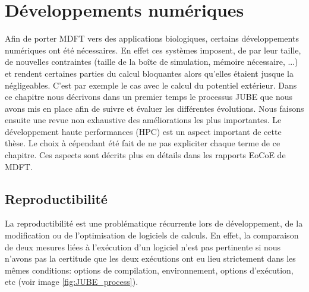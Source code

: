 \chapter{Développements numériques}
\label{chap:numerique}



Afin de porter MDFT vers des applications biologiques, certains développements numériques ont été nécessaires. En effet ces systèmes imposent, de par leur taille, de nouvelles contraintes (taille de la boîte de simulation, mémoire nécessaire, ...) et rendent certaines parties du calcul bloquantes alors qu'elles étaient jusque la négligeables. C'est par exemple le cas avec le calcul du potentiel extérieur. Dans ce chapitre nous décrivons dans un premier temps le processus JUBE que nous avons mis en place afin de suivre et évaluer les différentes évolutions. Nous faisons ensuite une revue non exhaustive des améliorations les plus importantes. Le développement haute performances (HPC) est un aspect important de cette thèse. Le choix à cépendant été fait de ne pas expliciter chaque terme de ce chapitre. Ces aspects sont décrits plus en détails dans les rapports EoCoE de MDFT.


\section{Reproductibilité}
La reproductibilité est une problématique récurrente lors de développement, de la modification ou de l'optimisation de logiciels de calculs. En effet, la comparaison de deux mesures liées à l’exécution d'un logiciel n'est pas pertinente si nous n'avons pas la certitude que les deux exécutions ont eu lieu strictement dans les mêmes conditions: options de compilation, environnement, options d’exécution, etc (voir image \ref{fig:JUBE_process}).

